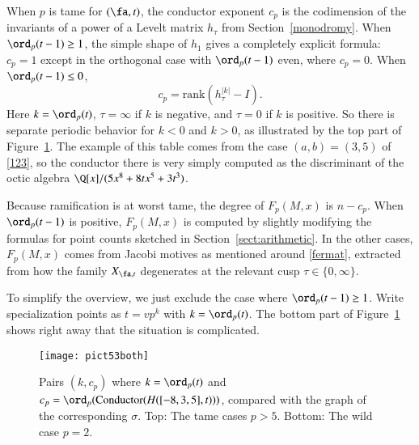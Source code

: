 \documentclass{notices}
\numberwithin{equation}{section}
\numberwithin{table}{section}
\numberwithin{figure}{section}
\begin{document}
{  
When $p$ is tame for $(\fa,t)$, the conductor exponent $c_p$ is 
the codimension of the invariants of a power of a Levelt matrix $h_\tau$
from Section~\ref{monodromy}.  When $\ord_p(t-1) \geq 1$,
the simple shape 
of $h_1$ gives a completely explicit formula: $c_p=1$
except in the orthogonal case with $\ord_p(t-1)$ even, 
where $c_p=0$.  When $\ord_p(t-1) \leq 0$, 
\begin{equation}
c_p =  \mbox{rank}(h_\tau^{|k|} -I).  \label{cptame}
\end{equation}
Here $k=\ord_p(t)$, $\tau = \infty$ if $k$ is negative, and $\tau=0$ if 
$k$ is positive.   So there is separate periodic behavior for
$k<0$ and $k>0$, as illustrated by the top part of Figure~\ref{pict53both}.
The example of this table comes from the case $(a,b)=(3,5)$ of \eqref{123},
so the conductor there is very simply computed as the discriminant
of the octic algebra $\Q[x]/(5 x^8 + 8 t x^5 + 3 t^3)$.  

Because ramification is at worst tame, the degree of $F_p(M,x)$ 
is $n-c_p$.   When $\ord_p(t-1)$ is
positive, $F_p(M,x)$ is computed by slightly modifying
the formulas for point counts sketched in Section~\ref{sect:arithmetic}.
In the other cases, $F_p(M,x)$ comes
from Jacobi motives as mentioned around \eqref{fermat}, 
extracted from how 
the family $X_{\fa,t}$ degenerates at the relevant
cusp $\tau \in \{0,\infty\}$.

 To simplify the overview, we just exclude the case 
where $\ord_p(t-1) \geq 1$.  Write specialization points as 
$t = vp^k$ with $k = \ord_p(t)$.  The bottom part of Figure~\ref{pict53both} shows
right away that the situation is complicated.   
\begin{figure}[htb]
\begin{center}
\texttt{[image: pict53both]}
\end{center}
\caption{\label{pict53both} Pairs $(k,c_p)$ where $k = \ord_p(t)$
and $c_p = \ord_p(\mbox{Conductor}(H([-8,3,5],t)))$,  compared with the graph
of the corresponding $\sigma$.    
 Top: The tame cases $p>5$.
Bottom: The wild case $p=2$.} 
\end{figure}

}
\end{document}
